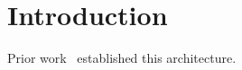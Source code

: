 \documentclass{article}
\begin{document}
\section{Introduction}\label{sec:intro}
Prior work~\cite{vaswani2017, lecun2015} established this architecture.


\end{document}
